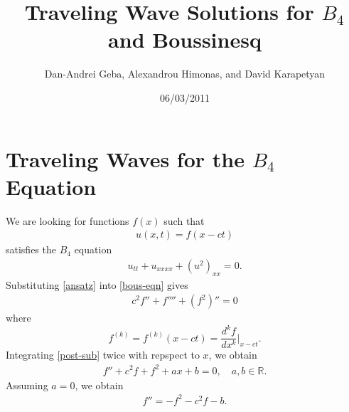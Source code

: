 \documentclass[12pt,reqno]{amsart}
\numberwithin{equation}{section}  %
\newcommand{\rr}{\mathbb{R}}
\begin{document}
\title{Traveling Wave Solutions for $B_{4}$ and Boussinesq}
\author{Dan-Andrei Geba, Alexandrou Himonas, and David Karapetyan}
\address{Department of Mathematics, University of Rochester, Rochester, NY 14627}
\address{Department of Mathematics, University of Notre Dame, Notre Dame, IN 46556}
\address{Department of Mathematics, University of Notre Dame, Notre Dame, IN 46556}
\date{06/03/2011}
%
%
\maketitle
%
%
%
%
%
%
%
%
\section{Traveling Waves for the $B_{4}$ Equation} 
\label{sec:trav-wave}
We are looking for functions $f(x)$ such that
%
%
\begin{equation}
  \label{ansatz}
\begin{split}
u(x,t) = f(x-ct)
\end{split}
\end{equation}
%
%
satisfies the $B_{4}$ equation
%
%
\begin{equation}
  \label{bous-eqn}
\begin{split}
  u_{tt} + u_{xxxx} + (u^{2})_{xx} = 0.
\end{split}
\end{equation}
%
%
Substituting \eqref{ansatz} into \eqref{bous-eqn} gives
%
%
\begin{equation}
\begin{split}
  c^{2} f'' + f'''' + (f^{2})'' = 0
\end{split}
\label{post-sub}
\end{equation}
%
%
where $$f^{(k)} = f^{(k)}(x-ct) = \frac{d^{k}f}{dx^{k}} \Big |_{x-ct}.$$ 
Integrating \eqref{post-sub} twice with repspect to $x$, we obtain
%
%
\begin{equation}
  \label{pre-const-elim}
\begin{split}
  f'' + c^{2} f + f^{2} + ax +b = 0, \quad a,b \in \rr.
\end{split}
\end{equation}
%
%
%
%
Assuming $a = 0$, we obtain
%
\begin{equation}
  \label{2nd-order-ode-pre}
\begin{split}
  f'' = - f^{2} -c^{2} f -b.
\end{split}
\end{equation}
\end{document}
